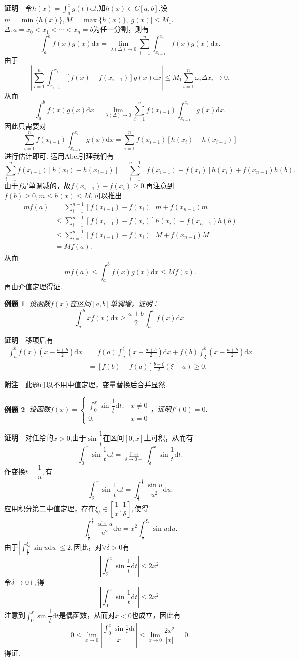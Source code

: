 \documentclass[UTF8]{article}
\newcommand{\dx}{\mathrm{d}x}
\newcommand{\zm}{\textbf{证明}$\quad$}
\newcommand{\fz}{\textbf{附注}$\quad$}
\newtheorem{exa}{\hspace{2em}例题}[section]
\begin{document}
\zm 令$h(x)=\displaystyle\int_a^xg(t)\mathrm{d}t.$知$h(x)\in C[a,b].$设$m=\min\{h(x)\},M=\max\{h(x)\},|g(x)|\le M_1$.\\
$\Delta:a=x_0<x_1<\cdots<x_n=b$为任一分割，则有
$$\int_a^bf(x)g(x)\dx=\lim_{\lambda(\Delta)\to0}\sum_{i=1}^n\int_{x_{i-1}}^{x_i}f(x)g(x)\dx.$$由于
$$\left|\sum_{i=1}^n\int_{x_{i-1}}^{x_i}[f(x)-f(x_{i-1})]g(x)\dx\right|\le M_1\sum_{i=1}^n\omega_i\Delta x_i\to0.$$
从而
$$\int_a^bf(x)g(x)\dx=\lim_{\lambda(\Delta)\to0}\sum_{i=1}^nf(x_{i-1})\int_{x_{i-1}}^{x_i}g(x)\dx.$$
因此只需要对
$$\sum_{i=1}^nf(x_{i-1})\int_{x_{i-1}}^{x_i}g(x)\dx=\sum_{i=1}^nf(x_{i-1})[h(x_i)-h(x_{i-1})]$$进行估计即可.
运用Abel引理我们有
$$\sum_{i=1}^nf(x_{i-1})[h(x_i)-h(x_{i-1})]=\sum_{i=1}^{n-1}[f(x_{i-1})-f(x_i)]h(x_i)+f(x_{n-1})h(b).$$
由于$f$是单调减的，故$f(x_{i-1})-f(x_i)\ge 0.$再注意到$f(b)\ge0,m\le h(x)\le M,$可以推出
\begin{align*}
  mf(a)&=\sum_{i=1}^{n-1}[f(x_{i-1})-f(x_i)]m+f(x_{n-1})m\\
  &\le\sum_{i=1}^{n-1}[f(x_{i-1})-f(x_i)]h(x_i)+f(x_{n-1})h(b)\\
  &\le\sum_{i=1}^{n-1}[f(x_{i-1})-f(x_i)]M+f(x_{n-1})M\\
  &=Mf(a).
\end{align*}
从而$$mf(a)\le \int_a^bf(x)g(x)\dx\le Mf(a).$$再由介值定理得证.
\begin{exa}
  设函数$f(x)$在区间$[a,b]$单调增，证明：
  $$\int_a^bxf(x)\dx\ge\frac{a+b}{2}\int_a^bf(x)\dx.$$
\end{exa}
\zm 移项后有
\begin{align*}
  \int_a^bf(x)\left(x-\frac{a+b}{2}\right)\dx&=f(a)\int_a^\xi\left(x-\frac{a+b}{2}\right)\dx+
  f(b)\int_\xi^b\left(x-\frac{a+b}{2}\right)\dx\\
  &=[f(b)-f(a)]\frac{b-\xi}{2}(\xi-a)\ge 0.
\end{align*}

\fz 此题可以不用中值定理，变量替换后合并显然.
\begin{exa}
  设函数$f(x)=\begin{cases}\displaystyle\int_0^x\sin\dfrac{1}{t}\mathrm{d}t,&x\ne0\\0,&x=0\end{cases}$，证明$f'(0)=0.$
\end{exa}
\zm 对任给的$x>0$,由于$\sin\dfrac{1}{t}$在区间$[0,x]$上可积，从而有
$$\int_0^x\sin\dfrac{1}{t}\mathrm{d}t=\lim_{\delta\to0+}\int_\delta^x\sin\frac{1}{t}\mathrm{d}t.$$
作变换$t=\dfrac{1}{u},$有
$$\int_\delta^x\sin\frac{1}{t}\mathrm{d}t=\int_\frac{1}{x}^\frac{1}{\delta}\frac{\sin u}{u^2}\mathrm{d}u.$$
应用积分第二中值定理，存在$\xi_\delta\in\left[\dfrac{1}{x},\dfrac{1}{\delta}\right],$使得
$$\int_\frac{1}{x}^\frac{1}{\delta}\frac{\sin u}{u^2}\mathrm{d}u=x^2\int_\frac{1}{x}^{\xi_\delta}\sin u\mathrm{d}u.$$
由于$\left|\int_\frac{1}{x}^{\xi_\delta}\sin u\mathrm{d}u\right|\le 2,$因此，对$\forall \delta>0$有
$$\left|\int_\delta^x\sin\frac{1}{t}\mathrm{d}t\right|\le 2x^2.$$
令$\delta\to0+,$得
$$\left|\int_0^x\sin\frac{1}{t}\mathrm{d}t\right|\le 2x^2.$$
注意到$\displaystyle\int_0^x\sin\dfrac{1}{t}\mathrm{d}t$是偶函数，从而对$x<0$也成立，因此有
$$0\le\lim_{x\to0}\left|\frac{\int_0^x\sin\frac{1}{t}\mathrm{d}t}{x}\right|\le\lim_{x\to0}\frac{2x^2}{|x|}=0.$$
得证.
\end{document}
